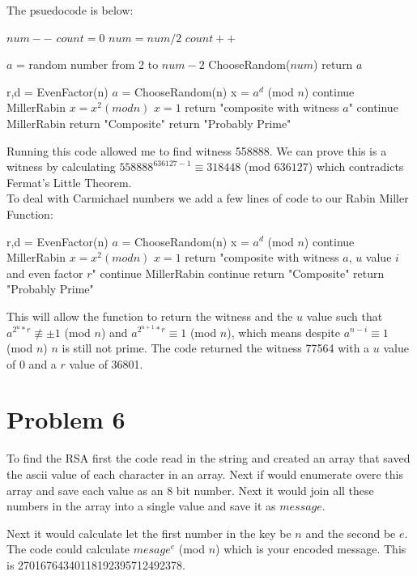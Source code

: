 \documentclass[11pt]{article}
\begin{document}
The psuedocode is below:
\begin{algorithmic}
	\State $num --$
	\State $count = 0$
		\State $num= num/2$
		\State $count++$	
	\EndWhile
\EndFunction

	\State $a$ = random number from 2 to $num -2$
		\State ChooseRandom($num$)
	\Else
		\State return $a$
	\EndIf
\EndFunction

	\State r,d = EvenFactor(n)
		\State $a$ = ChooseRandom(n)
		\State x = $a^d$ (mod $n$)
			continue MillerRabin
		\EndIf
			\State $x = x^2 (mod n)$
			\If $x =1$
				\State return "composite with witness $a$"
			\EndIf
				\State continue MillerRabin
			\EndIf
		\EndFor
		\State return "Composite"
	\EndFor
	\State return "Probably Prime"
\EndFunction
\end{algorithmic}

Running this code allowed me to find witness 558888. We can prove this is a witness by calculating $558888^{636127-1} \equiv 318448$ (mod $636127$) which contradicts Fermat's Little Theorem. \\

To deal with Carmichael numbers we add a few lines of code to our Rabin Miller Function:

\begin{algorithmic}
	\State r,d = EvenFactor(n)
		\State $a$ = ChooseRandom(n)
		\State x = $a^d$ (mod $n$)
			continue MillerRabin
		\EndIf
			\State $x = x^2 (mod n)$
			\If $x =1$
				\State return "composite with witness $a$, $u$ value $i$ and even factor $r$"
			\EndIf
				\State continue MillerRabin
			\EndIf
		\EndFor
			\State continue
		\Else
			\State return "Composite"
		\EndIf
	\EndFor
	\State return "Probably Prime"
\EndFunction
\end{algorithmic}


This will allow the function to return the witness and the $u$ value such that $a^{2^u*r} \not\equiv \pm 1 $ (mod $n$) and $a^{2^{u+1}*r} \equiv 1$ (mod $n$), which means despite $a^{n-i} \equiv 1$ (mod $n$) $n$ is still not prime. The code returned the witness 77564 with a $u$ value of 0 and a $r$ value of 36801.

\section*{Problem 6}
To find the RSA first the code read in the string and created an array that saved the ascii value of each character in an array. Next if would enumerate overe this array and save each value as an 8 bit number. Next it would join all these numbers in the array into a single value and save it as $message$.

Next it would calculate let the first number in the key be $n$ and the second be $e$. The code could calculate $mesage^e$ (mod $n$) which is your encoded message. This is 27016764340118192395712492378.
\end{document}
